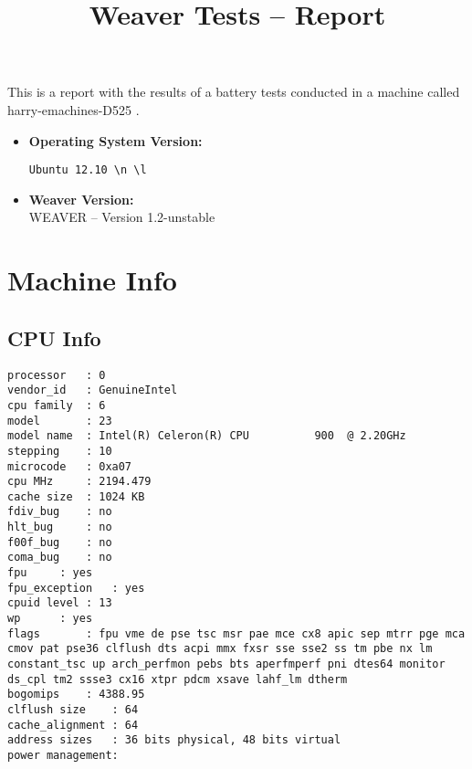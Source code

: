 \documentclass{article}
\title{Weaver Tests -- Report}
\begin{document}
\maketitle
This is a report with the results of a battery
tests conducted in a machine called 
harry-emachines-D525
.
\begin{itemize}
\item
\textbf{Operating System Version: }
\begin{verbatim}
Ubuntu 12.10 \n \l

\end{verbatim}
\item
\textbf{Weaver Version: }\\
WEAVER -- Version 1.2-unstable
\end{itemize}
\section{Machine Info}
\subsection{CPU Info}
\begin{verbatim}
processor	: 0
vendor_id	: GenuineIntel
cpu family	: 6
model		: 23
model name	: Intel(R) Celeron(R) CPU          900  @ 2.20GHz
stepping	: 10
microcode	: 0xa07
cpu MHz		: 2194.479
cache size	: 1024 KB
fdiv_bug	: no
hlt_bug		: no
f00f_bug	: no
coma_bug	: no
fpu		: yes
fpu_exception	: yes
cpuid level	: 13
wp		: yes
flags		: fpu vme de pse tsc msr pae mce cx8 apic sep mtrr pge mca cmov pat pse36 clflush dts acpi mmx fxsr sse sse2 ss tm pbe nx lm constant_tsc up arch_perfmon pebs bts aperfmperf pni dtes64 monitor ds_cpl tm2 ssse3 cx16 xtpr pdcm xsave lahf_lm dtherm
bogomips	: 4388.95
clflush size	: 64
cache_alignment	: 64
address sizes	: 36 bits physical, 48 bits virtual
power management:

\end{verbatim}
\end{document}
